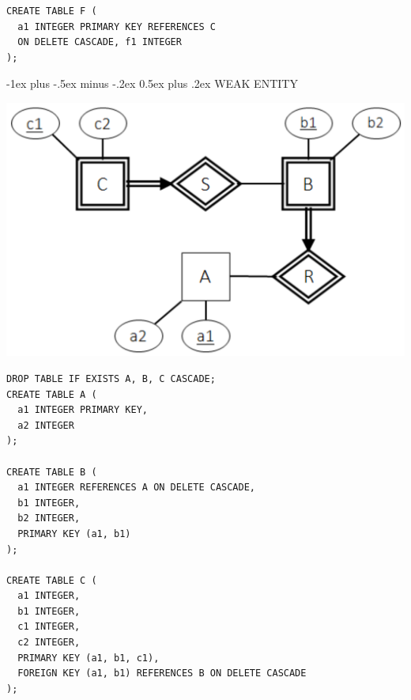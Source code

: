 \documentclass[10pt, landscape]{article}
\makeatletter
\renewcommand{\section}{\@startsection{section}{1}{0mm}%
  {-1ex plus -.5ex minus -.2ex}%
  {0.5ex plus .2ex}%
{\normalfont\large\bfseries}}
\makeatother
\begin{document}
\begin{multicols*}{3}
\begin{lstlisting}[style=mySQL]
CREATE TABLE F (
  a1 INTEGER PRIMARY KEY REFERENCES C
  ON DELETE CASCADE, f1 INTEGER
);
  \end{lstlisting}

  \section{WEAK ENTITY}
  \begin{tightcenter}
    \includegraphics[width=0.9\linewidth]{cs2102-er-model-weak-entity.png} 
  \end{tightcenter}
  \begin{lstlisting}[style=mySQL]
DROP TABLE IF EXISTS A, B, C CASCADE;
CREATE TABLE A (
  a1 INTEGER PRIMARY KEY,
  a2 INTEGER 
);

CREATE TABLE B (
  a1 INTEGER REFERENCES A ON DELETE CASCADE,
  b1 INTEGER,
  b2 INTEGER,
  PRIMARY KEY (a1, b1) 
);

CREATE TABLE C ( 
  a1 INTEGER, 
  b1 INTEGER,
  c1 INTEGER,
  c2 INTEGER,
  PRIMARY KEY (a1, b1, c1),
  FOREIGN KEY (a1, b1) REFERENCES B ON DELETE CASCADE
);
  \end{lstlisting}

\end{multicols*}

\pagebreak
\end{document}
